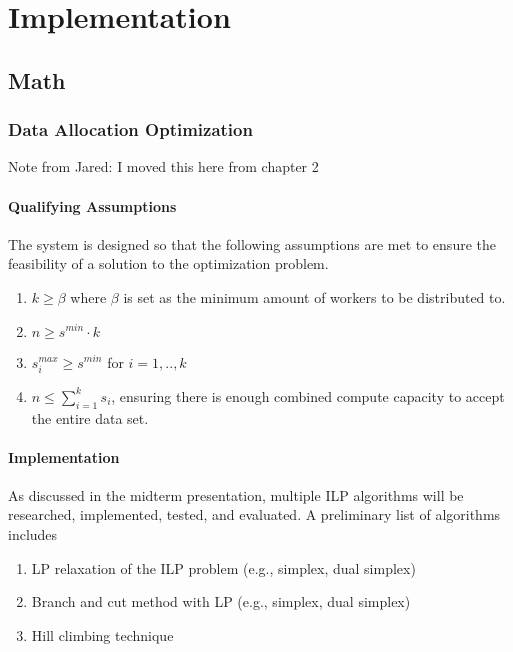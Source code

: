 \documentclass[../mthe-493-final-project.tex]{subfiles}
\begin{document}
    \chapter{Implementation}
    \label{ch:implementation}

    \section{Math}
    \label{sec:Math}

    \subsection{Data Allocation Optimization}
    \label{ssec:data-allocation-optimization}
    Note from Jared: I moved this here from chapter 2

    \subsubsection{Qualifying Assumptions}
    The system is designed so that the following assumptions are met to ensure the feasibility of a solution to the optimization problem.

    \begin{enumerate}
        \item $k \geq \beta$ where $\beta$ is set as the minimum amount of workers to be distributed to.
        \item $n \geq s^{min} \cdot k$
        \item $s_i^{max} \geq s^{min}$ for $i = 1,..,k$
        \item $n \leq \sum_{i=1}^k s_i$, ensuring there is enough combined compute capacity to accept the entire data set.

    \end{enumerate}

    \subsubsection{Implementation}

    As discussed in the midterm presentation, multiple ILP algorithms will be researched, implemented, tested, and evaluated. A preliminary list of algorithms includes

    \begin{enumerate}
        \item LP relaxation of the ILP problem (e.g., simplex, dual simplex)
        \item Branch and cut method with LP (e.g., simplex, dual simplex)
        \item Hill climbing technique
    \end{enumerate}
\end{document}
